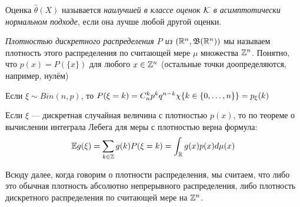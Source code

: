 \begin{definition}
	Оценка $\hat{\theta}(X)$ называется \textit{наилучшей в классе оценок $\mathcal{K}$ в асимптотически нормальном подходе}, если она лучше любой другой оценки.
\end{definition}

\begin{note}
	\textit{Плотностью дискретного распределения $P$ из $(\mathbb{R}^n, \mathfrak{B}(\mathbb{R}^n))$} мы называем плотность этого распределения по считающей мере $\mu$ множества $\mathbb{Z}^n$. Понятно, что $p(x) = P(\{x\})$ для любого $x \in \mathbb{Z}^n$ (остальные точки доопределяются, например, нулём)
\end{note}

\begin{example}
	Если $\xi \sim Bin(n, p)$, то $P(\xi = k) = C_n^kp^kq^{n - k}\chi\{k \in \{0, \ldots, n\}\} = p_\xi(k)$
\end{example}

\begin{reminder}
	Если $\xi$ --- дискретная случайная величина с плотностью $p(x)$, то по теореме о вычислении интеграла Лебега для меры с плотностью верна формула:
	\[
		\mathbb{E} g(\xi) = \sum_{k \in \mathbb{Z}} g(k)P(\xi = k) = \int_{\mathbb{R}} g(x)p(x)d\mu(x)
	\]
\end{reminder}

\begin{note}
	Всюду далее, когда говорим о плотности распределения, мы считаем, что либо это обычная плотность абсолютно непрерывного распределения, либо плотность дискретного распределения по считающей мере на $\mathbb{Z}^n$.
\end{note}